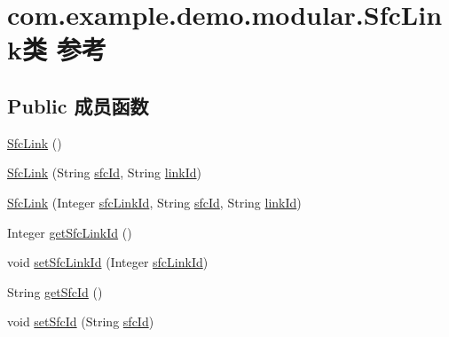 \hypertarget{classcom_1_1example_1_1demo_1_1modular_1_1_sfc_link}{}\section{com.\+example.\+demo.\+modular.\+Sfc\+Link类 参考}
\label{classcom_1_1example_1_1demo_1_1modular_1_1_sfc_link}
\subsection*{Public 成员函数}
\begin{DoxyCompactItemize}
\item 
\mbox{\hyperlink{classcom_1_1example_1_1demo_1_1modular_1_1_sfc_link_abc1797f91870a2a0720ffb1235352599}{Sfc\+Link}} ()
\item 
\mbox{\hyperlink{classcom_1_1example_1_1demo_1_1modular_1_1_sfc_link_a3503de12c1b514767f96deab0add51be}{Sfc\+Link}} (String \mbox{\hyperlink{classcom_1_1example_1_1demo_1_1modular_1_1_sfc_link_a65b01ef9a84d86e0f1d6ccefe66cb69c}{sfc\+Id}}, String \mbox{\hyperlink{classcom_1_1example_1_1demo_1_1modular_1_1_sfc_link_a031499b601fbf3abddd7faef4934ba02}{link\+Id}})
\item 
\mbox{\hyperlink{classcom_1_1example_1_1demo_1_1modular_1_1_sfc_link_a8b4ffbe67c8f4fbc04c7bd41cd18fb14}{Sfc\+Link}} (Integer \mbox{\hyperlink{classcom_1_1example_1_1demo_1_1modular_1_1_sfc_link_a9892796c1822cec476ad963ec8cc7a23}{sfc\+Link\+Id}}, String \mbox{\hyperlink{classcom_1_1example_1_1demo_1_1modular_1_1_sfc_link_a65b01ef9a84d86e0f1d6ccefe66cb69c}{sfc\+Id}}, String \mbox{\hyperlink{classcom_1_1example_1_1demo_1_1modular_1_1_sfc_link_a031499b601fbf3abddd7faef4934ba02}{link\+Id}})
\item 
Integer \mbox{\hyperlink{classcom_1_1example_1_1demo_1_1modular_1_1_sfc_link_a3d906c324f43f8008424fe949ebd0446}{get\+Sfc\+Link\+Id}} ()
\item 
void \mbox{\hyperlink{classcom_1_1example_1_1demo_1_1modular_1_1_sfc_link_a50fd249f013fc79207919cf51a5c4280}{set\+Sfc\+Link\+Id}} (Integer \mbox{\hyperlink{classcom_1_1example_1_1demo_1_1modular_1_1_sfc_link_a9892796c1822cec476ad963ec8cc7a23}{sfc\+Link\+Id}})
\item 
String \mbox{\hyperlink{classcom_1_1example_1_1demo_1_1modular_1_1_sfc_link_aa47577e37f16e59d8cd11d33e4fe69d4}{get\+Sfc\+Id}} ()
\item 
void \mbox{\hyperlink{classcom_1_1example_1_1demo_1_1modular_1_1_sfc_link_a628445a1e8beaffc0499b6ae4e59ed43}{set\+Sfc\+Id}} (String \mbox{\hyperlink{classcom_1_1example_1_1demo_1_1modular_1_1_sfc_link_a65b01ef9a84d86e0f1d6ccefe66cb69c}{sfc\+Id}})

\end{DoxyCompactItemize}
